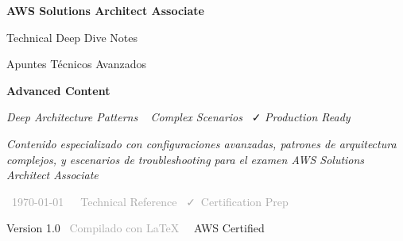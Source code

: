 \documentclass[12pt,a4paper]{report}
\begin{document}
\begin{titlepage}
    \centering
    \vspace*{1.5cm}
    
    {\Huge \textcolor{awsorange}{\faAws}}
    
    \vspace{0.5cm}
    
    {\huge\bfseries\color{awsblue} AWS Solutions Architect Associate}
    
    \vspace{0.8cm}
    
    {\Large\color{awsorange} Technical Deep Dive Notes}
    
    \vspace{0.3cm}
    
    {\large\color{darkgray} Apuntes Técnicos Avanzados}
    
    \vspace{1.5cm}
    
    \begin{center}
        \begin{tcolorbox}[width=0.8\textwidth, colback=lightgray!30, colframe=awsblue, arc=10pt, boxrule=2pt]
        \centering
        {\color{dangerred}\faExclamationTriangle} \textbf{Advanced Content} {\color{dangerred}\faExclamationTriangle}
        
        \vspace{0.3cm}
        
        {\small 
        \textcolor{awsblue}{\faCog} \textit{Deep Architecture Patterns} \textbar\ 
        \textcolor{awsorange}{\faCode} \textit{Complex Scenarios} \textbar\ 
        \textcolor{successgreen}{\faCheck} \textit{Production Ready}
        }
        \end{tcolorbox}
    \end{center}
    
    \vspace{1cm}
    
    \begin{center}
        \begin{minipage}{0.7\textwidth}
            \centering
            \textit{Contenido especializado con configuraciones avanzadas, patrones de arquitectura complejos, y escenarios de troubleshooting para el examen AWS Solutions Architect Associate}
        \end{minipage}
    \end{center}
    
    \vspace{1.5cm}
    
    {\small 
    \textcolor{darkgray}{
    \faCalendar\ \today\ \textbar\ 
    \faFile\ Technical Reference \textbar\ 
    \faCheck\ Certification Prep
    }
    }
    
    \vfill
    
    {\footnotesize 
    \textcolor{awsblue}{Version 1.0} \textbar\ 
    \textcolor{darkgray}{Compilado con \LaTeX} \textbar\ 
    \textcolor{awsorange}{\faAws\ AWS Certified}
    }
\end{titlepage}
\end{document}
